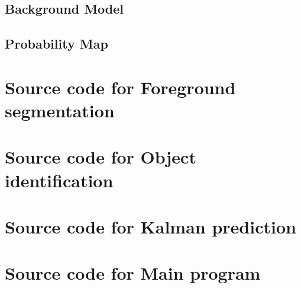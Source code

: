 \documentclass[10pt, a4paper, twoside]{article}
\numberwithin{equation}{section}
\numberwithin{figure}{section}
\begin{document}
\subsection{Background Model}


\newpage
\subsection{Probability Map}
\label{sec:ProbMap_code}

\newpage


\newpage
\section{Source code for Foreground segmentation}
\label{sec:ForeGroundSeg_code}

\newpage


\newpage
\section{Source code for Object identification}
\label{sec:ObjID_code}

\newpage


\newpage
\section{Source code for Kalman prediction}
\label{sec:Kalman_code}

\newpage


\newpage
\section{Source code for Main program}
\label{sec:Main_code}



%
\end{document}
